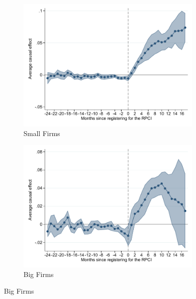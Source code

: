 \documentclass[oneside,11pt]{article}
\begin{document}
\begin{figure}[H]
\begin{center}
    \begin{subfigure}{0.49\textwidth}
    \caption{Small Firms}
    \includegraphics[width=\textwidth]{04_Figures/muestra_10porciento/event_study_log_sal_cierre_chaisemartin_pyme.pdf}
    \end{subfigure}
    \begin{subfigure}{0.49\textwidth}
    \caption{Big Firms}
    \includegraphics[width=\textwidth]{04_Figures/muestra_10porciento/event_study_log_sal_cierre_chaisemartin_emp_grande.pdf}
    \end{subfigure}
    
    \end{center}
\end{figure}
\end{document}
